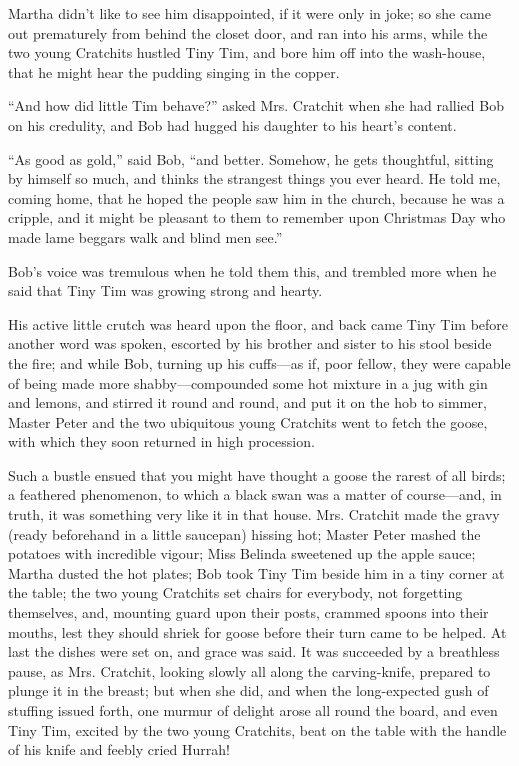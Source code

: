 \documentclass[paper=5.5in:8.5in,BCOR=15mm,twoside,DIV=15,headinclude=off,12pt,chapterprefix=off,openany,headings=huge]{scrbook} %
\begin{document}
Martha didn't like to see him disappointed, if it were only in joke; so she came out prematurely from behind the closet door, and ran into his arms, while the two young Cratchits hustled Tiny Tim, and bore him off into the wash-house, that he might hear the pudding singing in the copper.

\enquote{And how did little Tim behave?} asked Mrs. Cratchit when she had rallied Bob on his credulity, and Bob had hugged his daughter to his heart's content.

\enquote{As good as gold,} said Bob, \enquote{and better. Somehow, he gets thoughtful, sitting by himself so much, and thinks the strangest things you ever heard. He told me, coming home, that he hoped the people saw him in the church, because he was a cripple, and it might be pleasant to them to remember upon Christmas Day who made lame beggars walk and blind men see.}

Bob's voice was tremulous when he told them this, and trembled more when he said that Tiny Tim was growing strong and hearty.

His active little crutch was heard upon the floor, and back came Tiny Tim before another word was spoken, escorted by his brother and sister to his stool beside the fire; and while Bob, turning up his cuffs—as if, poor fellow, they were capable of being made more shabby—compounded some hot mixture in a jug with gin and lemons, and stirred it round and round, and put it on the hob to simmer, Master Peter and the two ubiquitous young Cratchits went to fetch the goose, with which they soon returned in high procession.



Such a bustle ensued that you might have thought a goose the rarest of all birds; a feathered phenomenon, to which a black swan was a matter of course—and, in truth, it was something very like it in that house. Mrs. Cratchit made the gravy (ready beforehand in a little saucepan) hissing hot; Master Peter mashed the potatoes with incredible vigour; Miss Belinda sweetened up the apple sauce; Martha dusted the hot plates; Bob took Tiny Tim beside him in a tiny corner at the table; the two young Cratchits set chairs for everybody, not forgetting themselves, and, mounting guard upon their posts, crammed spoons into their mouths, lest they should shriek for goose before their turn came to be helped. At last the dishes were set on, and grace was said. It was succeeded by a breathless pause, as Mrs. Cratchit, looking slowly all along the carving-knife, prepared to plunge it in the breast; but when she did, and when the long-expected gush of stuffing issued forth, one murmur of delight arose all round the board, and even Tiny Tim, excited by the two young Cratchits, beat on the table with the handle of his knife and feebly cried Hurrah!
\end{document}
